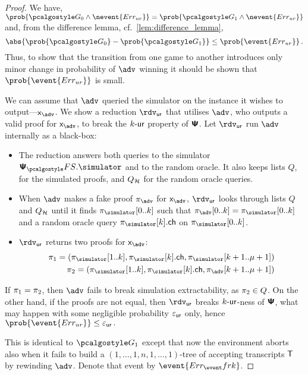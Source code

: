 \documentclass[runningheads,11pt]{llncs}
\theoremstyle{definition} \newtheorem{definition}[theorem]{Definition}
\begin{document}
\begin{proof}
   We have, \( \prob{\game{0} \land
    \nevent{\errur}} = \prob{\game{1} \land \nevent{\errur}} \) and, from the
  difference lemma, cf.~\cref{lem:difference_lemma},
  \[ \abs{\prob{\game{0}} - \prob{\game{1}}} \leq \prob{\event{\errur}}\,. \]
  Thus, to show that the transition from one game to another introduces only
  minor change in probability of $\advse$ winning it should be shown that
  $\prob{\event{\errur}}$ is small.

  We can assume that $\advse$ queried the simulator on the instance it wishes to
  output---$\inp_{\advse}$. We show a reduction $\rdvur$ that utilises $\advse$,
  who outputs a valid proof for $\inp_{\advse}$, to break the ${k\text{-}\mathsf{ur}}$ property of
  $\bm{\mathsf{\Psi}}$. Let $\rdvur$ run $\advse$ internally as a black-box:
\begin{itemize}
	\item The reduction answers both queries to the simulator $\psfs.\simulator$ and to the random oracle. 
	It also keeps lists $Q$, for the simulated proofs, and $Q_{\mathcal{H}}$ for the random oracle queries. 
\item When $\advse$ makes a fake proof $\zkproof_{\advse}$ for $\inp_{\advse}$,
  $\rdvur$ looks through lists $Q$ and $Q_{\mathcal{H}}$ until it finds
  $\zkproof_{\simulator}[0..k]$ such that
  $\zkproof_{\advse}[0..k] = \zkproof_{\simulator}[0..k]$
  and a random oracle query $\zkproof_{\simulator}[k].\ch$ on
  $\zkproof_{\simulator}[0..k]$.
	\item $\rdvur$ returns two proofs for $\inp_{\advse}$:
	\begin{align*}
		\zkproof_1 = (\zkproof_{\simulator}[1..k],
		\zkproof_{\simulator}[k].\ch, \zkproof_{\simulator}[k + 1..\mu + 1])\\
		\zkproof_2 = (\zkproof_{\simulator}[1..k],
		\zkproof_{\simulator}[k].\ch, \zkproof_{\advse}[k + 1..\mu + 1])
	\end{align*}
	\end{itemize}  
	If $\pi_1 = \pi_2$, then $\advse$ fails to break simulation
  extractability, as $\pi_2 \in Q$. On the other hand, if the proofs are
  not equal, then $\rdvur$ breaks ${k\text{-}\mathsf{ur}}$-ness of $\bm{\mathsf{\Psi}}$, what may happen with
  some negligible probability $\varepsilon_{\mathsf{ur}}$ only, hence \( \prob{\event{\errur}} \leq
  \epsur\,. \)
	
   This is identical to $\game{1}$ except that now the environment
  aborts also when it fails to build a $(1, \ldots, 1, n, 1, \ldots, 1)$-tree
  of accepting transcripts $\mathsf{T}$ by rewinding $\advse$. Denote that event by
  $\event{\errfrk}$. 


\end{proof}
\end{document}
